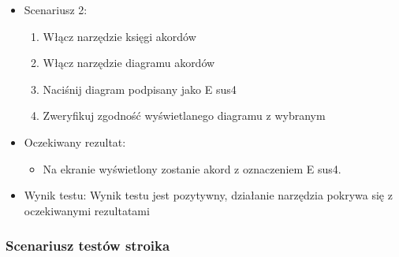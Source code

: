\begin{itemize}
    \item Scenariusz 2:
        \begin{enumerate}
            \item Włącz narzędzie księgi akordów
            \item Włącz narzędzie diagramu akordów
            \item Naciśnij diagram podpisany jako E sus4
            \item Zweryfikuj zgodność wyświetlanego diagramu z wybranym
        \end{enumerate}
    \item Oczekiwany rezultat:
        \begin{itemize}
            \item Na ekranie wyświetlony zostanie akord z oznaczeniem E sus4.
        \end{itemize}
    \item Wynik testu: Wynik testu jest pozytywny, działanie narzędzia pokrywa się z oczekiwanymi rezultatami
\end{itemize}

\subsubsection{Scenariusz testów stroika}

